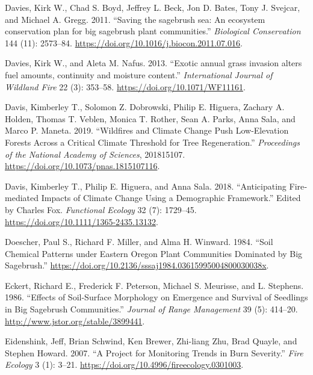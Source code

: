 \documentclass[
  12pt,
]{article}
\newlength{\cslhangindent}
\newlength{\cslentryspacingunit} %
\newenvironment{CSLReferences}[2] %
 {%
  \setlength{\parindent}{0pt}
  \ifodd #1
  \let\oldpar\par
  \def\par{\hangindent=\cslhangindent\oldpar}
  \fi
  \setlength{\parskip}{#2\cslentryspacingunit}
 }%
 {}
\begin{document}
\begin{CSLReferences}{1}{0}
\leavevmode{}%
Davies, Kirk W., Chad S. Boyd, Jeffrey L. Beck, Jon D. Bates, Tony J.
Svejcar, and Michael A. Gregg. 2011. {``{Saving the sagebrush sea: An
ecosystem conservation plan for big sagebrush plant communities}.''}
\emph{Biological Conservation} 144 (11): 2573--84.
\url{https://doi.org/10.1016/j.biocon.2011.07.016}.

\leavevmode{}%
Davies, Kirk W., and Aleta M. Nafus. 2013. {``{Exotic annual grass
invasion alters fuel amounts, continuity and moisture content}.''}
\emph{International Journal of Wildland Fire} 22 (3): 353--58.
\url{https://doi.org/10.1071/WF11161}.

\leavevmode{}%
Davis, Kimberley T., Solomon Z. Dobrowski, Philip E. Higuera, Zachary A.
Holden, Thomas T. Veblen, Monica T. Rother, Sean A. Parks, Anna Sala,
and Marco P. Maneta. 2019. {``Wildfires and Climate Change Push
Low-Elevation Forests Across a Critical Climate Threshold for Tree
Regeneration.''} \emph{Proceedings of the National Academy of Sciences},
201815107. \url{https://doi.org/10.1073/pnas.1815107116}.

\leavevmode{}%
Davis, Kimberley T., Philip E. Higuera, and Anna Sala. 2018.
{``Anticipating Fire‐mediated Impacts of Climate Change Using a
Demographic Framework.''} Edited by Charles Fox. \emph{Functional
Ecology} 32 (7): 1729--45.
\url{https://doi.org/10.1111/1365-2435.13132}.

\leavevmode{}%
Doescher, Paul S., Richard F. Miller, and Alma H. Winward. 1984.
{``{Soil Chemical Patterns under Eastern Oregon Plant Communities
Dominated by Big Sagebrush}.''}
\url{https://doi.org/10.2136/sssaj1984.03615995004800030038x}.

\leavevmode{}%
Eckert, Richard E., Frederick F. Peterson, Michael S. Meurisse, and L.
Stephens. 1986. {``{Effects of Soil-Surface Morphology on Emergence and
Survival of Seedlings in Big Sagebrush Communities}.''} \emph{Journal of
Range Management} 39 (5): 414--20.
\url{http://www.jstor.org/stable/3899441}.

\leavevmode{}%
Eidenshink, Jeff, Brian Schwind, Ken Brewer, Zhi-liang Zhu, Brad Quayle,
and Stephen Howard. 2007. {``{A Project for Monitoring Trends in Burn
Severity}.''} \emph{Fire Ecology} 3 (1): 3--21.
\url{https://doi.org/10.4996/fireecology.0301003}.


\end{CSLReferences}
\end{document}
